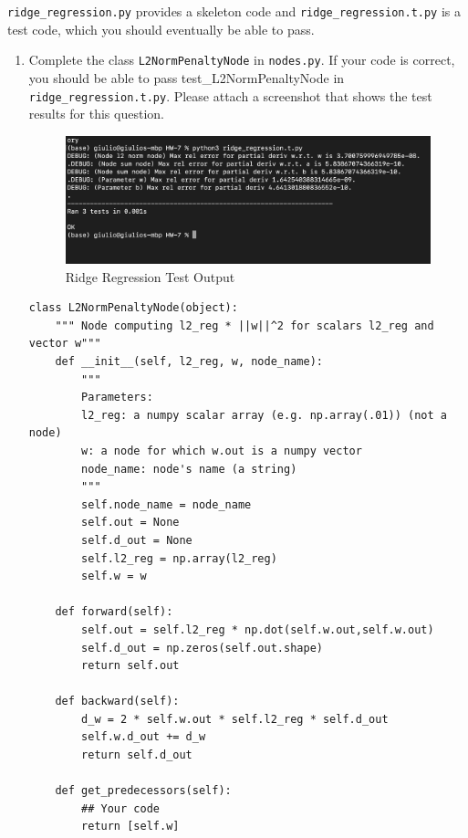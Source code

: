 \documentclass{article}
\theoremstyle{plain}
\theoremstyle{definition}
\begin{document}
\texttt{ridge\_regression.py} provides a skeleton code
and \texttt{ridge\_regression.t.py} is a test code, which you should
eventually be able to pass.
\begin{enumerate}
\setcounter{enumi}{\value{saveenum}}

\newpage 

\item Complete the class \texttt{L2NormPenaltyNode} in \texttt{nodes.py}. If your code is correct, you should be able to pass test\_L2NormPenaltyNode in \texttt{ridge\_regression.t.py}. Please attach a screenshot that shows the test results for this question.

\begin{figure}[h!]
    \centering
    \includegraphics[scale=.4]{Ridge Regression Test Outputs.png}
    \caption{Ridge Regression Test Output}
    \label{fig:Ridge test}
\end{figure}
\subitem

\begin{verbatim}
class L2NormPenaltyNode(object):
    """ Node computing l2_reg * ||w||^2 for scalars l2_reg and vector w"""
    def __init__(self, l2_reg, w, node_name):
        """ 
        Parameters:
        l2_reg: a numpy scalar array (e.g. np.array(.01)) (not a node)
        w: a node for which w.out is a numpy vector
        node_name: node's name (a string)
        """
        self.node_name = node_name
        self.out = None
        self.d_out = None
        self.l2_reg = np.array(l2_reg)
        self.w = w

    def forward(self):
        self.out = self.l2_reg * np.dot(self.w.out,self.w.out)
        self.d_out = np.zeros(self.out.shape)
        return self.out

    def backward(self):
        d_w = 2 * self.w.out * self.l2_reg * self.d_out
        self.w.d_out += d_w
        return self.d_out
        
    def get_predecessors(self):
        ## Your code
        return [self.w]
\end{verbatim}


\end{enumerate}
\end{document}
